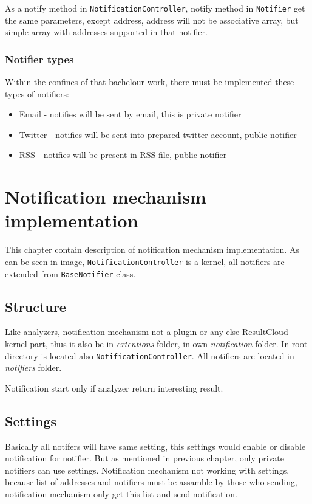 As a notify method in \texttt{NotificationController}, notify method in \texttt{Notifier} get the same parameters, except address, address will not be associative array, but simple array with addresses supported in that notifier. 

\subsection{Notifier types}

Within the confines of that bachelour work, there must be implemented these types of notifiers:
\begin{itemize} 
\item Email - notifies will be sent by email, this is private notifier
\item Twitter - notifies will be sent into prepared twitter account, public notifier
\item RSS - notifies will be present in RSS file, public notifier
\end{itemize}  

\chapter{Notification mechanism implementation}

This chapter contain description of notification mechanism implementation. As can be seen in image, \texttt{NotificationController} is a kernel, all notifiers are extended from \texttt{BaseNotifier} class.

\section{Structure}

Like analyzers, notification mechanism not a plugin or any else ResultCloud kernel part, thus it also be in \emph{extentions} folder, in own \emph{notification} folder. In root directory is located also \texttt{NotificationController}. All notifiers are located in \emph{notifiers} folder.

Notification start only if analyzer return interesting result.

\section{Settings}

Basically all notifers will have same setting, this settings would enable or disable notification for notifier. But as mentioned in previous chapter, only private notifiers can use settings. Notification mechanism not working with settings, because list of addresses and notifiers must be assamble by those who sending, notification mechanism only get this list and send notification. 

